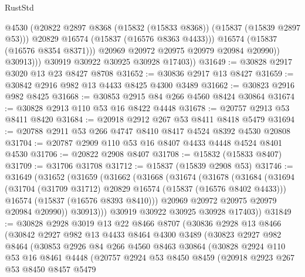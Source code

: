 \begin{lexlean}{RustStd}
\begin{coremodule}
{\begin{coremodule}
{{{{{{{{{{{{{{{{{{{{{{{{{{{{{{{{{{{{{{{{{{{{{{{{{{{{{{{{{{{{                      @4530
                      (@20822 @2897 @8368 (@15832 (@15833 @8368)) (@15837 (@15839 @2897 @53)))
                      @20829
                      @16574
                      (@15837 (@16576 @8363 @4433)))
                    @16574
                    (@15837 (@16576 @8354 @8371)))
                  @20969
                  @20972
                  @20975
                  @20979
                  @20984
                  @20990))
              @30913)))
        @30919
        @30922
        @30925
        @30928
        @17403))
@31649 := @30828 @2917 @3020 @13 @23 @8427 @8708
@31652 := @30836 @2917 @13 @8427
@31659 := @30842 @2916 @982 @13 @4433 @8425 @4300 @3489
@31662 := @30823 @2916 @982 @8425
@31668 := @30853 @2915 @84 @266 @4560 @8424 @30864
@31674 := @30828 @2913 @110 @53 @16 @8422 @4448
@31678 := @20757 @2913 @53 @8411 @8420
@31684 := @20918 @2912 @267 @53 @8411 @8418 @5479
@31694 := @20788 @2911 @53 @266 @4747 @8410 @8417 @4524 @8392 @4530 @20808
@31704 := @20787 @2909 @110 @53 @16 @8407 @4433 @4448 @4524 @8401 @4530
@31706 := @20822 @2908 @8407
@31708 := @15832 (@15833 @8407)
@31709 := @31706 @31708
@31712 := @15837 (@15839 @2908 @53)
@31746 := @31649
    (@31652
      (@31659
        (@31662
          (@31668
            (@31674
              (@31678
                (@31684
                  (@31694
                    (@31704 (@31709 @31712) @20829 @16574 (@15837 (@16576 @8402 @4433)))
                    @16574
                    (@15837 (@16576 @8393 @8410)))
                  @20969
                  @20972
                  @20975
                  @20979
                  @20984
                  @20990))
              @30913)))
        @30919
        @30922
        @30925
        @30928
        @17403))
@31849 := @30828
    @2928
    @3019
    @13
    @22
    @8466
    @8707
    (@30836
      @2928
      @13
      @8466
      (@30842
        @2927
        @982
        @13
        @4433
        @8464
        @4300
        @3489
        (@30823
          @2927
          @982
          @8464
          (@30853
            @2926
            @84
            @266
            @4560
            @8463
            @30864
            (@30828
              @2924
              @110
              @53
              @16
              @8461
              @4448
              (@20757
                @2924
                @53
                @8450
                @8459
                (@20918
                  @2923
                  @267
                  @53
                  @8450
                  @8457
                  @5479
}}}}}}}}}}}}}}}}}}}}}}}}}}}}}}}}}}}}}}}}}}}}}}}}}}}}}}}}}}}}
\end{coremodule}}
\end{coremodule}
\end{lexlean}
